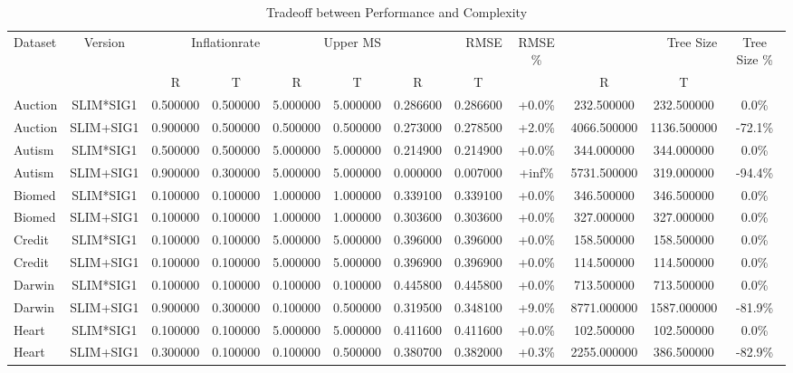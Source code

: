 
    \begin{table}[H]
        \centering
        \renewcommand{\arraystretch}{1.2}
        \caption{Tradeoff between Performance and Complexity}
        \label{tab:RQ_Inflationrate_tradeoff}
    \begin{tabular}{lccccccccccc}
\toprule
Dataset & Version & \multicolumn{2}{r}{Inflationrate} & \multicolumn{2}{r}{Upper MS} & \multicolumn{2}{r}{RMSE} & RMSE \% & \multicolumn{2}{r}{Tree Size} & Tree Size \% \\
 &  &  R &  T &  R &  T &  R &  T &  &  R &  T &  \\
\midrule
Auction & SLIM*SIG1 & 0.500000 & 0.500000 & 5.000000 & 5.000000 & 0.286600 & 0.286600 & +0.0\% & 232.500000 & 232.500000 & 0.0\% \\
Auction & SLIM+SIG1 & 0.900000 & 0.500000 & 0.500000 & 0.500000 & 0.273000 & 0.278500 & +2.0\% & 4066.500000 & 1136.500000 & -72.1\% \\
Autism & SLIM*SIG1 & 0.500000 & 0.500000 & 5.000000 & 5.000000 & 0.214900 & 0.214900 & +0.0\% & 344.000000 & 344.000000 & 0.0\% \\
Autism & SLIM+SIG1 & 0.900000 & 0.300000 & 5.000000 & 5.000000 & 0.000000 & 0.007000 & +inf\% & 5731.500000 & 319.000000 & -94.4\% \\
Biomed & SLIM*SIG1 & 0.100000 & 0.100000 & 1.000000 & 1.000000 & 0.339100 & 0.339100 & +0.0\% & 346.500000 & 346.500000 & 0.0\% \\
Biomed & SLIM+SIG1 & 0.100000 & 0.100000 & 1.000000 & 1.000000 & 0.303600 & 0.303600 & +0.0\% & 327.000000 & 327.000000 & 0.0\% \\
Credit & SLIM*SIG1 & 0.100000 & 0.100000 & 5.000000 & 5.000000 & 0.396000 & 0.396000 & +0.0\% & 158.500000 & 158.500000 & 0.0\% \\
Credit & SLIM+SIG1 & 0.100000 & 0.100000 & 5.000000 & 5.000000 & 0.396900 & 0.396900 & +0.0\% & 114.500000 & 114.500000 & 0.0\% \\
Darwin & SLIM*SIG1 & 0.100000 & 0.100000 & 0.100000 & 0.100000 & 0.445800 & 0.445800 & +0.0\% & 713.500000 & 713.500000 & 0.0\% \\
Darwin & SLIM+SIG1 & 0.900000 & 0.300000 & 0.100000 & 0.500000 & 0.319500 & 0.348100 & +9.0\% & 8771.000000 & 1587.000000 & -81.9\% \\
Heart & SLIM*SIG1 & 0.100000 & 0.100000 & 5.000000 & 5.000000 & 0.411600 & 0.411600 & +0.0\% & 102.500000 & 102.500000 & 0.0\% \\
Heart & SLIM+SIG1 & 0.300000 & 0.100000 & 0.100000 & 0.500000 & 0.380700 & 0.382000 & +0.3\% & 2255.000000 & 386.500000 & -82.9\% \\

\end{tabular}
\end{table}
